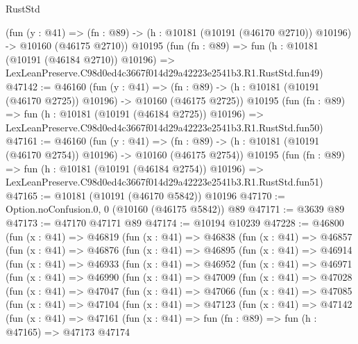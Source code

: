 \begin{lexlean}{RustStd}
\begin{coremodule}
    (fun (y : @41) =>
    (fn : @89) -> (h : @10181 (@10191 (@46170 @2710)) @10196) -> @10160 (@46175 @2710))
    @10195
    (fun (fn : @89) =>
    fun (h : @10181 (@10191 (@46184 @2710)) @10196) =>
    LexLeanPreserve.C98d0ed4c3667f014d29a42223e2541b3.R1.RustStd.fun49)
@47142 := @46160
    (fun (y : @41) =>
    (fn : @89) -> (h : @10181 (@10191 (@46170 @2725)) @10196) -> @10160 (@46175 @2725))
    @10195
    (fun (fn : @89) =>
    fun (h : @10181 (@10191 (@46184 @2725)) @10196) =>
    LexLeanPreserve.C98d0ed4c3667f014d29a42223e2541b3.R1.RustStd.fun50)
@47161 := @46160
    (fun (y : @41) =>
    (fn : @89) -> (h : @10181 (@10191 (@46170 @2754)) @10196) -> @10160 (@46175 @2754))
    @10195
    (fun (fn : @89) =>
    fun (h : @10181 (@10191 (@46184 @2754)) @10196) =>
    LexLeanPreserve.C98d0ed4c3667f014d29a42223e2541b3.R1.RustStd.fun51)
@47165 := @10181 (@10191 (@46170 @5842)) @10196
@47170 := Option.noConfusion.{0, 0} (@10160 (@46175 @5842)) @89
@47171 := @3639 @89
@47173 := @47170 @47171 @89
@47174 := @10194 @10239
@47228 := @46800
    (fun (x : @41) =>
    @46819
      (fun (x : @41) =>
      @46838
        (fun (x : @41) =>
        @46857
          (fun (x : @41) =>
          @46876
            (fun (x : @41) =>
            @46895
              (fun (x : @41) =>
              @46914
                (fun (x : @41) =>
                @46933
                  (fun (x : @41) =>
                  @46952
                    (fun (x : @41) =>
                    @46971
                      (fun (x : @41) =>
                      @46990
                        (fun (x : @41) =>
                        @47009
                          (fun (x : @41) =>
                          @47028
                            (fun (x : @41) =>
                            @47047
                              (fun (x : @41) =>
                              @47066
                                (fun (x : @41) =>
                                @47085
                                  (fun (x : @41) =>
                                  @47104
                                    (fun (x : @41) =>
                                    @47123
                                      (fun (x : @41) =>
                                      @47142
                                        (fun (x : @41) =>
                                        @47161
                                          (fun (x : @41) =>
                                          fun (fn : @89) =>
                                          fun (h : @47165) =>
                                          @47173
                                            @47174

\end{coremodule}
\end{lexlean}
